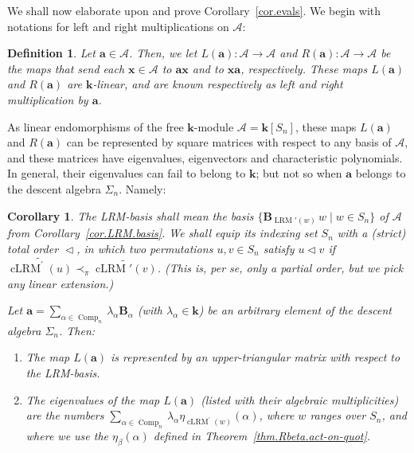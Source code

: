 \documentclass[submission]{FPSAC2026}
\newtheorem{defn}{Definition}
\newtheorem{corollary}{Corollary}
\newcommand{\cLRM}{\operatorname{cLRM}}
\newcommand{\LRM}{\operatorname{LRM}}
\begin{document}
We shall now elaborate upon and prove Corollary~\ref{cor.evals}. We begin with
notations for left and right multiplications on $\mathcal{A}$:

\begin{defn}
Let $\mathbf{a}\in\mathcal{A}$. Then, we let $L\left(  \mathbf{a}\right)
:\mathcal{A}\rightarrow\mathcal{A}$ and $R\left(  \mathbf{a}\right)
:\mathcal{A}\rightarrow\mathcal{A}$ be the maps that send each $\mathbf{x}%
\in\mathcal{A}$ to $\mathbf{ax}$ and to $\mathbf{xa}$, respectively. These
maps $L\left(  \mathbf{a}\right)  $ and $R\left(  \mathbf{a}\right)  $ are
$\mathbf{k}$-linear, and are known respectively as \emph{left }and \emph{right
multiplication} by $\mathbf{a}$.
\end{defn}

As linear endomorphisms of the free $\mathbf{k}$-module $\mathcal{A}%
=\mathbf{k}\left[  S_{n}\right]  $, these maps $L\left(  \mathbf{a}\right)  $
and $R\left(  \mathbf{a}\right)  $ can be represented by square matrices with
respect to any basis of $\mathcal{A}$, and these matrices have eigenvalues,
eigenvectors and characteristic polynomials. In general, their eigenvalues can
fail to belong to $\mathbf{k}$; but not so when $\mathbf{a}$ belongs to the
descent algebra $\Sigma_{n}$. Namely:

\begin{corollary}
\label{cor.evals2}The \emph{LRM-basis} shall mean the basis $\bigl\{\mathbf{B}%
_{\LRM'(w)}\,w\;\big|\;w\in S_{n}\bigr\}$ of $\mathcal{A}$
from
Corollary~\ref{cor.LRM.basis}. We shall equip its indexing set $S_{n}$ with a
(strict) total order $\vartriangleleft$, in which two permutations $u,v\in
S_{n}$ satisfy $u\vartriangleleft v$ if $\widetilde{\operatorname*{cLRM}%
\nolimits^{\prime}\left(  u\right)  }\prec_{\pi}%
\widetilde{\cLRM'\left(  v\right)  }$. (This
is, per se, only a partial order, but we pick any linear extension.)

Let $\mathbf{a}=\sum_{\alpha\in\operatorname{Comp}_{n}}\lambda_{\alpha
}\mathbf{B}_{\alpha}$ (with $\lambda_{\alpha}\in\mathbf{k}$) be an arbitrary
element of the descent algebra $\Sigma_{n}$. Then:

\begin{enumerate}
\item[\textbf{(a)}] The map $L\left(  \mathbf{a}\right)  $ is represented by
an upper-triangular matrix with respect to the LRM-basis.

\item[\textbf{(b)}] The eigenvalues of the map $L\left(  \mathbf{a}\right)  $
(listed with their algebraic multiplicities) are the numbers $\sum_{\alpha
\in\operatorname{Comp}_{n}}\lambda_{\alpha}\eta_{\operatorname{cLRM}^{\prime
}(w)}\left(  \alpha\right)  $, where $w$ ranges over $S_{n}$, and where we use
the $\eta_{\beta}\left(  \alpha\right)  $ defined in
Theorem~\ref{thm.Rbeta.act-on-quot}.
\end{enumerate}
\end{corollary}
\end{document}
